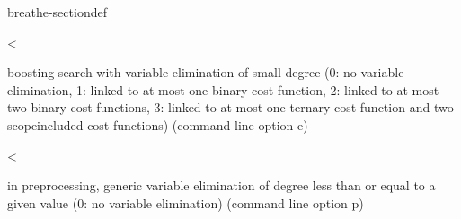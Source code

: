 \documentclass[letterpaper,10pt,openany,oneside,english]{sphinxmanual}
\begin{document}
\begin{fulllineitems}
\begin{sphinxuseclass}{breathe-sectiondef}
\begin{fulllineitems}
\label{\detokenize{ref/ref_cpp:_CPPv4N8ToulBar224elimDegree_preprocessingE}}\label{\detokenize{ref/ref_cpp:_CPPv3N8ToulBar224elimDegree_preprocessingE}}\label{\detokenize{ref/ref_cpp:_CPPv2N8ToulBar224elimDegree_preprocessingE}}\label{\detokenize{ref/ref_cpp:ToulBar2::elimDegree_preprocessing__i}}
\pysigstartsignatures
\pysigstartmultiline
{}
\pysigstopmultiline
\pysigstopsignatures
\sphinxAtStartPar
\textless{} 

\sphinxAtStartPar
boosting search with variable elimination of small degree (0: no variable elimination, 1: linked to at most one binary cost function, 2: linked to at most two binary cost functions, 3: linked to at most one ternary cost function and two scope\sphinxhyphen{}included cost functions) (command line option \sphinxhyphen{}e) 

\end{fulllineitems}


\begin{fulllineitems}
\label{\detokenize{ref/ref_cpp:_CPPv4N8ToulBar211elimDegree_E}}\label{\detokenize{ref/ref_cpp:_CPPv3N8ToulBar211elimDegree_E}}\label{\detokenize{ref/ref_cpp:_CPPv2N8ToulBar211elimDegree_E}}\label{\detokenize{ref/ref_cpp:ToulBar2::elimDegree___i}}
\pysigstartsignatures
\pysigstartmultiline
{}
\pysigstopmultiline
\pysigstopsignatures
\sphinxAtStartPar
\textless{} 

\sphinxAtStartPar
in preprocessing, generic variable elimination of degree less than or equal to a given value (0: no variable elimination) (command line option \sphinxhyphen{}p) 

\end{fulllineitems}



\end{sphinxuseclass}
\end{fulllineitems}
\end{document}
